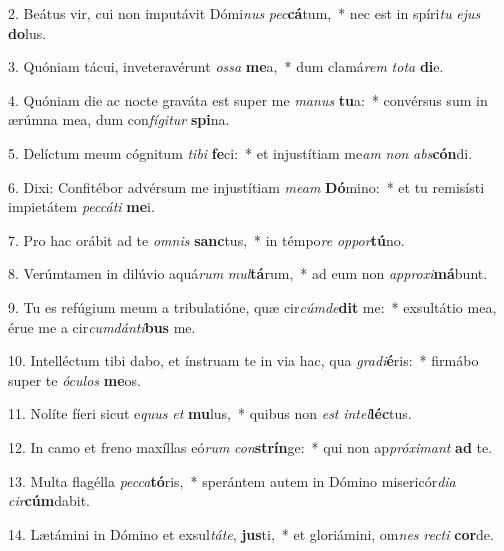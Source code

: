 2. Beátus vir, cui non imputávit Dómi\textit{nus} \textit{pec}\textbf{cá}tum,~*  nec est in spíri\textit{tu} \textit{e}\textit{jus} \textbf{do}lus.\

3. Quóniam tácui, inveteravérunt \textit{os}\textit{sa} \textbf{me}a,~*  dum clamá\textit{rem} \textit{to}\textit{ta} \textbf{di}e.\

4. Quóniam die ac nocte graváta est super me \textit{ma}\textit{nus} \textbf{tu}a:~*  convérsus sum in ærúmna mea, dum con\textit{fí}\textit{gi}\textit{tur} \textbf{spi}na.\

5. Delíctum meum cógnitum \textit{ti}\textit{bi} \textbf{fe}ci:~*  et injustítiam me\textit{am} \textit{non} \textit{abs}\textbf{cón}di.\

6. Dixi: Confitébor advérsum me injustítiam \textit{me}\textit{am} \textbf{Dó}mino:~*  et tu remisísti impietátem \textit{pec}\textit{cá}\textit{ti} \textbf{me}i.\

7. Pro hac orábit ad te \textit{om}\textit{nis} \textbf{sanc}tus,~*  in témpo\textit{re} \textit{op}\textit{por}\textbf{tú}no.\

8. Verúmtamen in dilúvio aquá\textit{rum} \textit{mul}\textbf{tá}rum,~*  ad eum non \textit{ap}\textit{pro}\textit{xi}\textbf{má}bunt.\

9. Tu es refúgium meum a tribulatióne, quæ cir\textit{cúm}\textit{de}\textbf{dit} me:~*  exsultátio mea, érue me a cir\textit{cum}\textit{dán}\textit{ti}\textbf{bus} me.\

10. Intelléctum tibi dabo, et ínstruam te in via hac, qua \textit{gra}\textit{di}\textbf{é}ris:~*  firmábo super te \textit{ó}\textit{cu}\textit{los} \textbf{me}os.\

11. Nolíte fíeri sicut e\textit{quus} \textit{et} \textbf{mu}lus,~*  quibus non \textit{est} \textit{in}\textit{tel}\textbf{léc}tus.\

12. In camo et freno maxíllas eó\textit{rum} \textit{con}\textbf{strín}ge:~*  qui non ap\textit{pró}\textit{xi}\textit{mant} \textbf{ad} te.\

13. Multa flagélla \textit{pec}\textit{ca}\textbf{tó}ris,~*  sperántem autem in Dómino misericór\textit{di}\textit{a} \textit{cir}\textbf{cúm}dabit.\

14. Lætámini in Dómino et exsul\textit{tá}\textit{te}, \textbf{jus}ti,~*  et gloriámini, om\textit{nes} \textit{rec}\textit{ti} \textbf{cor}de.\

